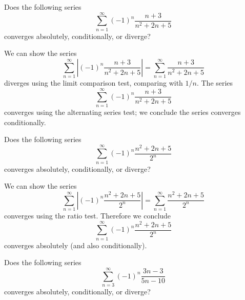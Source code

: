 \documentclass{ximera}
\begin{document}
\begin{question}
  Does the following series
  \[
  \sum_{n=1}^\infty (-1)^n\frac{n+3}{n^2+2n+5}
  \]
  converges absolutely, conditionally, or diverge?
  \begin{prompt}
    \begin{selectAll}
    \end{selectAll}
    \begin{feedback}
      We can show the series
      \[
      \sum_{n=1}^\infty \left|(-1)^n\frac{n+3}{n^2+2n+5}\right|=
      \sum_{n=1}^\infty \frac{n+3}{n^2+2n+5}
      \]
      diverges using the limit comparison test, comparing with $1/n$.
      The series
      \[
      \sum_{n=1}^\infty (-1)^n\frac{n+3}{n^2+2n+5}
      \]
      converges using the alternating series test; we conclude the
      series converges conditionally.
    \end{feedback}
  \end{prompt}
  \begin{question}
    Does the following series
    \[
    \sum_{n=1}^\infty (-1)^n\frac{n^2+2n+5}{2^n}
    \]
    converges absolutely, conditionally, or diverge?
    \begin{prompt}
      \begin{selectAll}
      \end{selectAll}
      \begin{feedback}
        We can show the series
        \[
        \sum_{n=1}^\infty \left|(-1)^n\frac{n^2+2n+5}{2^n}\right|=\sum_{n=1}^\infty \frac{n^2+2n+5}{2^n}
        \]
        converges using the ratio test.  Therefore we conclude
        \[
        \sum_{n=1}^\infty (-1)^n\frac{n^2+2n+5}{2^n}
        \]
        converges absolutely (and also conditionally).
      \end{feedback}
    \end{prompt}
    \begin{question}
      Does the following series
      \[
      \sum_{n=3}^\infty (-1)^n\frac{3n-3}{5n-10}
      \]
      converges absolutely, conditionally, or diverge?
      \begin{prompt}
        \begin{selectAll}

\end{selectAll}
\end{prompt}
\end{question}
\end{question}
\end{question}
\end{document}
